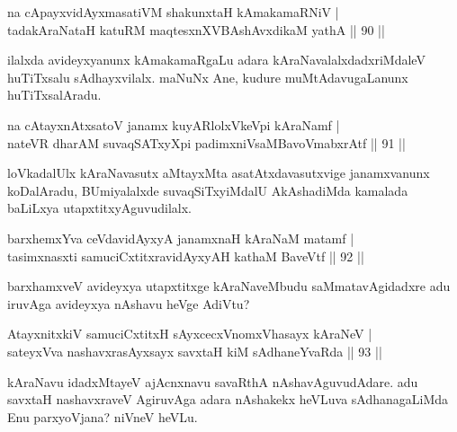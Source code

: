 
\begin{shl}
na cApayxvidAyxmasatiVM shakunxtaH kAmakamaRNiV |\\
tadakAraNataH katuRM maqtesxnXVBAshAvxdikaM yathA \hfill || 90 ||
\end{shl}

\begin{artha}
ilalxda avideyxyanunx kAmakamaRgaLu adara kAraNavalalxdadxriMdaleV huTiTxsalu 
sAdhayxvilalx. maNuNx Ane, kudure muMtAdavugaLanunx huTiTxsalAradu.
\end{artha}

\begin{shl}
na cAtayxnAtxsatoV janamx kuyARlolxVkeV\s pi kAraNamf |\\
nateVR dharAM suvaqSATxyX\s pi padimxniVsaMBavoV\s mabxrAtf \hfill || 91 ||
\end{shl}

\begin{artha}
loVkadalUlx kAraNavasutx aMtayxMta asatAtxdavasutxvige janamxvanunx koDalAradu, BUmiyalalxde suvaqSiTxyiMdalU AkAshadiMda kamalada baLiLxya utapxtitxyAguvudilalx.
\end{artha}

\begin{shl}
barxhemxYva ceVdavidAyxyA janamxnaH kAraNaM matamf |\\
tasimxnasxti samuciCxtitxravidAyxyAH kathaM BaveVtf \hfill || 92 ||
\end{shl}

\begin{artha}
barxhamxveV avideyxya  utapxtitxge kAraNaveMbudu saMmatavAgidadxre adu iruvAga avideyxya nAshavu heVge AdiVtu?
\end{artha}

\begin{shl}
AtayxnitxkiV samuciCxtitxH sAyxcecxVnomxVhasayx kAraNeV |\\
sateyxVva nashavxrasAyxsayx savxtaH kiM sAdhaneYvaRda \hfill || 93 ||
\end{shl}

\begin{artha}
kAraNavu idadxMtayeV ajAcnxnavu savaRthA nAshavAguvudAdare. adu savxtaH nashavxraveV AgiruvAga adara nAshakekx heVLuva sAdhanagaLiMda Enu parxyoVjana? niVneV heVLu.
\end{artha}


